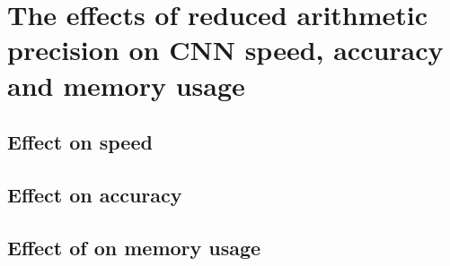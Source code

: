 \chapter{The effects of reduced arithmetic precision on CNN speed, accuracy and memory usage}
    \section{Effect on speed}
    \section{Effect on accuracy}
    \section{Effect of on memory usage}